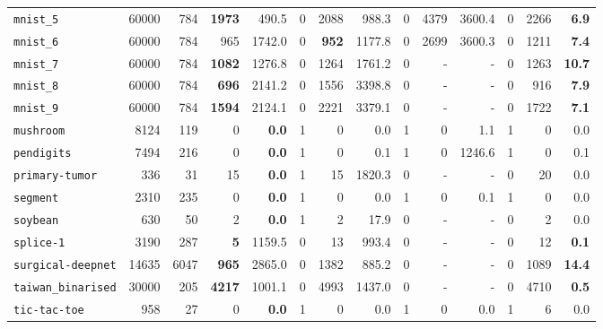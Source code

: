 \begin{tabular}{lccrrrrrrrrrrr}
\texttt{mnist\_5} & \multicolumn{1}{r}{60000} & \multicolumn{1}{r}{784}  & \textbf{1973} & 490.5 & 0 & 2088 & 988.3 & 0 & 4379 & 3600.4 & 0 & 2266 & \textbf{6.9}\\
\texttt{mnist\_6} & \multicolumn{1}{r}{60000} & \multicolumn{1}{r}{784}  & 965 & 1742.0 & 0 & \textbf{952} & 1177.8 & 0 & 2699 & 3600.3 & 0 & 1211 & \textbf{7.4}\\
\texttt{mnist\_7} & \multicolumn{1}{r}{60000} & \multicolumn{1}{r}{784}  & \textbf{1082} & 1276.8 & 0 & 1264 & 1761.2 & 0 & - & - & 0 & 1263 & \textbf{10.7}\\
\texttt{mnist\_8} & \multicolumn{1}{r}{60000} & \multicolumn{1}{r}{784}  & \textbf{696} & 2141.2 & 0 & 1556 & 3398.8 & 0 & - & - & 0 & 916 & \textbf{7.9}\\
\texttt{mnist\_9} & \multicolumn{1}{r}{60000} & \multicolumn{1}{r}{784}  & \textbf{1594} & 2124.1 & 0 & 2221 & 3379.1 & 0 & - & - & 0 & 1722 & \textbf{7.1}\\
\texttt{mushroom} & \multicolumn{1}{r}{8124} & \multicolumn{1}{r}{119}  & 0 & \textbf{0.0} & 1 & 0 & 0.0 & 1 & 0 & 1.1 & 1 & 0 & 0.0\\
\texttt{pendigits} & \multicolumn{1}{r}{7494} & \multicolumn{1}{r}{216}  & 0 & \textbf{0.0} & 1 & 0 & 0.1 & 1 & 0 & 1246.6 & 1 & 0 & 0.1\\
\texttt{primary-tumor} & \multicolumn{1}{r}{336} & \multicolumn{1}{r}{31}  & 15 & \textbf{0.0} & 1 & 15 & 1820.3 & 0 & - & - & 0 & 20 & 0.0\\
\texttt{segment} & \multicolumn{1}{r}{2310} & \multicolumn{1}{r}{235}  & 0 & \textbf{0.0} & 1 & 0 & 0.0 & 1 & 0 & 0.1 & 1 & 0 & 0.0\\
\texttt{soybean} & \multicolumn{1}{r}{630} & \multicolumn{1}{r}{50}  & 2 & \textbf{0.0} & 1 & 2 & 17.9 & 0 & - & - & 0 & 2 & 0.0\\
\texttt{splice-1} & \multicolumn{1}{r}{3190} & \multicolumn{1}{r}{287}  & \textbf{5} & 1159.5 & 0 & 13 & 993.4 & 0 & - & - & 0 & 12 & \textbf{0.1}\\
\texttt{surgical-deepnet} & \multicolumn{1}{r}{14635} & \multicolumn{1}{r}{6047}  & \textbf{965} & 2865.0 & 0 & 1382 & 885.2 & 0 & - & - & 0 & 1089 & \textbf{14.4}\\
\texttt{taiwan\_binarised} & \multicolumn{1}{r}{30000} & \multicolumn{1}{r}{205}  & \textbf{4217} & 1001.1 & 0 & 4993 & 1437.0 & 0 & - & - & 0 & 4710 & \textbf{0.5}\\
\texttt{tic-tac-toe} & \multicolumn{1}{r}{958} & \multicolumn{1}{r}{27}  & 0 & \textbf{0.0} & 1 & 0 & 0.0 & 1 & 0 & 0.0 & 1 & 6 & 0.0\\

\end{tabular}

